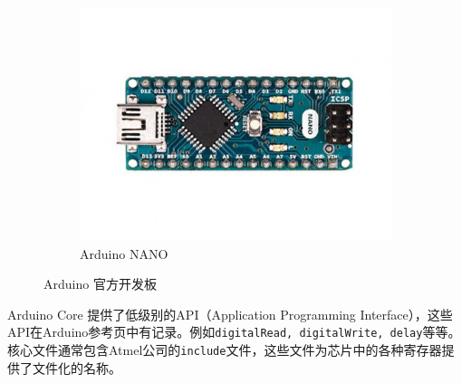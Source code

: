 \documentclass[scheme=chinese,a4paper]{article}
\begin{document}
\begin{figure}[H]
\begin{subfigure}[t]{0.25\textwidth}
    \includegraphics[width=\textwidth]{arduino_nano.jpg}
    \caption{Arduino NANO}
  \end{subfigure}
  \caption{Arduino 官方开发板}
\end{figure}

Arduino Core 提供了低级别的API（Application Programming Interface），这些API在Arduino参考页中有记录。例如\lstinline{digitalRead, digitalWrite, delay}等等。核心文件通常包含Atmel公司的\lstinline{include}文件，这些文件为芯片中的各种寄存器提供了文件化的名称。
\end{document}
